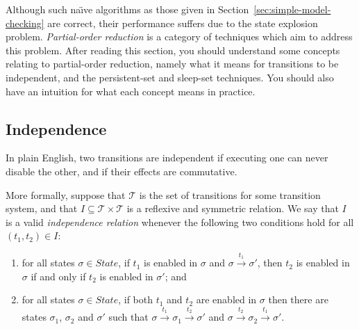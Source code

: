 \documentclass[12pt,a4paper,twoside,openright]{report}
\begin{document}
Although such na\"{\i}ve algorithms as those given
in Section~\ref{sec:simple-model-checking}
are correct, their performance suffers due to
the state explosion problem.
\emph{Partial-order reduction} is a category of
techniques which aim to address this problem.
After reading this section, you should
understand some concepts
relating to partial-order reduction, namely
what it means for transitions to be independent,
and the persistent-set and sleep-set techniques.
You should also have an intuition for
what each concept means in practice.

\subsection{Independence} \label{sec:independence}
In plain English, two transitions are independent if executing one
can never disable the other, and if their effects are commutative.

More formally, suppose that $\mathcal{T}$ is the set of
transitions for some transition system, and
that $I \subseteq \mathcal{T} \times \mathcal{T}$
is a reflexive and symmetric relation. We say
that $I$ is a valid \emph{independence relation}
whenever the following two conditions hold for
all $(t_1, t_2) \in I$:
\begin{enumerate}
	\item for all states $\sigma \in \textit{State}$,
		if $t_1$ is enabled in $\sigma$ and
		$\sigma \xrightarrow{t_1} \sigma'$, then
		$t_2$ is enabled in $\sigma$ if and only if
		$t_2$ is enabled in $\sigma'$; and
	\item for all states $\sigma \in \textit{State}$,
		if both $t_1$ and $t_2$ are enabled in $\sigma$
		then there are states $\sigma_1$, $\sigma_2$ and
		$\sigma'$ such that
		$\sigma \xrightarrow{t_1} \sigma_1 \xrightarrow{t_2} \sigma'$
		and
		$\sigma \xrightarrow{t_2} \sigma_2 \xrightarrow{t_1} \sigma'$.
\end{enumerate}
\end{document}
